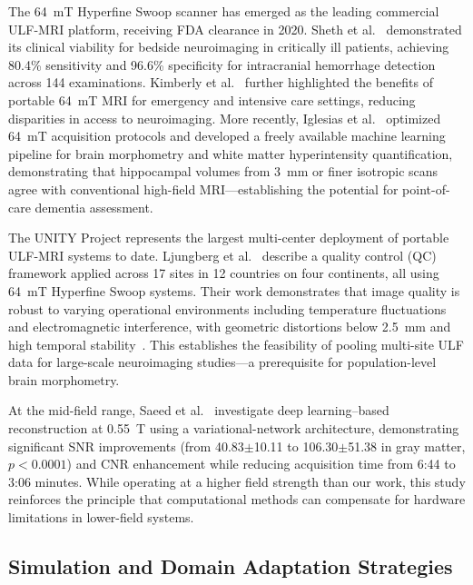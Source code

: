 The 64~mT Hyperfine Swoop scanner has emerged as the leading commercial ULF-MRI platform, receiving FDA clearance in 2020. Sheth et al.~\cite{sheth2021portable} demonstrated its clinical viability for bedside neuroimaging in critically ill patients, achieving 80.4\% sensitivity and 96.6\% specificity for intracranial hemorrhage detection across 144 examinations. Kimberly et al.~\cite{kimberly2023portable} further highlighted the benefits of portable 64~mT MRI for emergency and intensive care settings, reducing disparities in access to neuroimaging. More recently, Iglesias et al.~\cite{iglesias2024portable} optimized 64~mT acquisition protocols and developed a freely available machine learning pipeline for brain morphometry and white matter hyperintensity quantification, demonstrating that hippocampal volumes from 3~mm or finer isotropic scans agree with conventional high-field MRI---establishing the potential for point-of-care dementia assessment.

The UNITY Project represents the largest multi-center deployment of portable ULF-MRI systems to date. Ljungberg et al.~\cite{ljungberg2025unity} describe a quality control (QC) framework applied across 17 sites in 12 countries on four continents, all using 64~mT Hyperfine Swoop systems. Their work demonstrates that image quality is robust to varying operational environments including temperature fluctuations and electromagnetic interference, with geometric distortions below 2.5~mm and high temporal stability~\cite{ljungberg2025unity}. This establishes the feasibility of pooling multi-site ULF data for large-scale neuroimaging studies---a prerequisite for population-level brain morphometry.

At the mid-field range, Saeed et al.~\cite{saeed2026dlreconstruction} investigate deep learning--based reconstruction at 0.55~T using a variational-network architecture, demonstrating significant SNR improvements (from 40.83$\pm$10.11 to 106.30$\pm$51.38 in gray matter, $p < 0.0001$) and CNR enhancement while reducing acquisition time from 6:44 to 3:06 minutes. While operating at a higher field strength than our work, this study reinforces the principle that computational methods can compensate for hardware limitations in lower-field systems.

\subsection{Simulation and Domain Adaptation Strategies}

